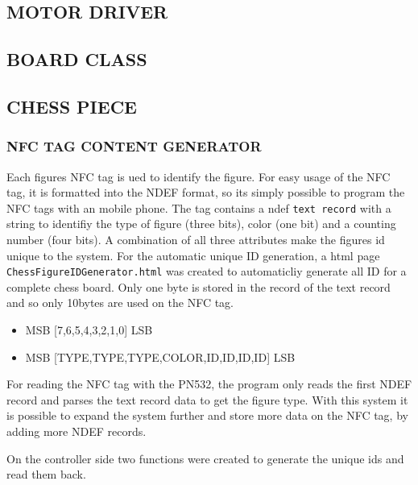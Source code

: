 \hypertarget{motor-driver}{%
\subsection{MOTOR DRIVER}\label{motor-driver}}

\hypertarget{board-class}{%
\subsection{BOARD CLASS}\label{board-class}}

\hypertarget{chess-piece}{%
\subsection{CHESS PIECE}\label{chess-piece}}

\hypertarget{nfc-tag-content-generator}{%
\subsubsection{NFC TAG CONTENT
GENERATOR}\label{nfc-tag-content-generator}}

Each figures NFC tag is ued to identify the figure. For easy usage of
the NFC tag, it is formatted into the NDEF format, so its simply
possible to program the NFC tags with an mobile phone. The tag contains
a ndef \passthrough{\lstinline!text record!} with a string to identifiy
the type of figure (three bits), color (one bit) and a counting number
(four bits). A combination of all three attributes make the figures id
unique to the system. For the automatic unique ID generation, a html
page \passthrough{\lstinline!ChessFigureIDGenerator.html!} was created
to automaticliy generate all ID for a complete chess board. Only one
byte is stored in the record of the text record and so only 10bytes are
used on the NFC tag.

\begin{itemize}
\tightlist
\item
  MSB {[}7,6,5,4,3,2,1,0{]} LSB
\item
  MSB {[}TYPE,TYPE,TYPE,COLOR,ID,ID,ID,ID{]} LSB
\end{itemize}

For reading the NFC tag with the PN532, the program only reads the first
NDEF record and parses the text record data to get the figure type. With
this system it is possible to expand the system further and store more
data on the NFC tag, by adding more NDEF records.

On the controller side two functions were created to generate the unique
ids and read them back.

